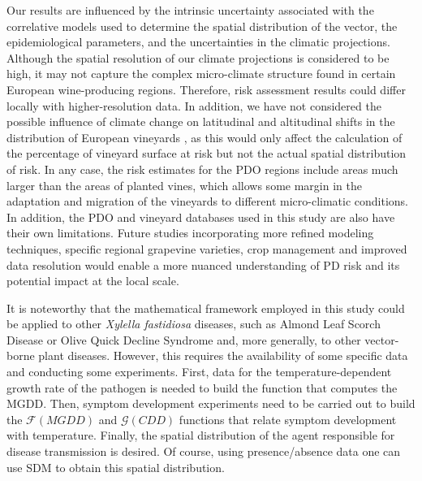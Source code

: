 Our results are influenced by the intrinsic uncertainty associated with the
correlative models used to determine the spatial distribution of the vector,
the epidemiological parameters, and the uncertainties in the climatic
projections. Although the spatial resolution of our climate projections is
considered to be high, it may not capture the complex micro-climate structure
found in certain European wine-producing regions. Therefore, risk assessment
results could differ locally with higher-resolution data. In addition, we have
not considered the possible influence of climate change on latitudinal and
altitudinal shifts in the distribution of European vineyards
\cite{hannah2013climate,moriondo2013projected}, as this would only affect the
calculation of the percentage of vineyard surface at risk but not the actual
spatial distribution of risk. In any case, the risk estimates for the PDO
regions include areas much larger than the areas of planted vines, which allows
some margin in the adaptation and migration of the vineyards to different
micro-climatic conditions. In addition, the PDO and vineyard databases used in
this study are also have their own limitations. Future studies incorporating
more refined modeling techniques, specific regional grapevine varieties, crop
management and improved data resolution would enable a more nuanced
understanding of PD risk and its potential impact at the local scale.

It is noteworthy that the mathematical framework employed in this study
could be applied to other \textit{Xylella fastidiosa} diseases, such as Almond
Leaf Scorch Disease or Olive Quick Decline Syndrome and, more generally, to
other vector-borne plant diseases. However, this requires the availability of
some specific data and conducting some experiments. First, data for the
temperature-dependent growth rate of the pathogen is needed to build the
function that computes the MGDD. Then, symptom development experiments need to
be carried out to build the $\mathcal{F}(MGDD)$ and $\mathcal{G}(CDD)$
functions that relate symptom development with temperature. Finally, the
spatial distribution of the agent responsible for disease transmission is
desired. Of course, using presence/absence data one can use SDM to obtain this
spatial distribution.

